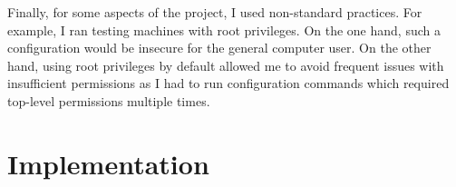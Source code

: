 \documentclass[12pt,a4paper]{report}
\begin{document}
    Finally, for some aspects of the project, I used non-standard practices.
    For example, I ran testing machines with root privileges.
    On the one hand, such a configuration would be insecure for the general computer user. On the other hand, using root privileges by default allowed me to avoid frequent issues with insufficient permissions as I had to run configuration commands which required top-level permissions multiple times.
    
    

\chapter{Implementation}






\end{document}
